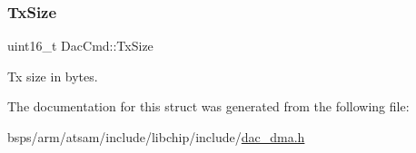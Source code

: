 \subsubsection{\texorpdfstring{TxSize}{TxSize}}
{\footnotesize\ttfamily uint16\+\_\+t Dac\+Cmd\+::\+Tx\+Size}

Tx size in bytes. 

The documentation for this struct was generated from the following file\+:\begin{DoxyCompactItemize}
\item 
bsps/arm/atsam/include/libchip/include/\mbox{\hyperlink{dac__dma_8h}{dac\+\_\+dma.\+h}}\end{DoxyCompactItemize}
